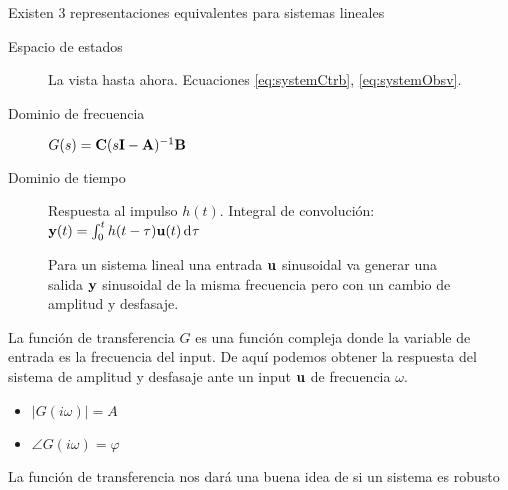 Existen 3 representaciones equivalentes para sistemas lineales
\begin{description}
	\item[Espacio de estados]  La vista hasta ahora. Ecuaciones \eqref{eq:systemCtrb}, \eqref{eq:systemObsv}.
	\item[Dominio de frecuencia] $G(s) = \mathbf{C} (s\mathbf{I} -\mathbf{A})^{-1}\mathbf{B}$
	\item[Dominio de tiempo	] Respuesta al impulso $h(t)$. Integral de convolución: $\Cy(t) = \int_0^t h(t-\tau)\Cu(t) \diff \tau$
\end{description}


\begin{figure}[htb!]
	\centering
{}
\caption{Para un sistema lineal una entrada $\mathbf{u}$ sinusoidal va generar una salida $\mathbf{y}$ sinusoidal de la misma frecuencia pero con un cambio de amplitud y desfasaje.}
\end{figure}

La función de transferencia $G$ es una función compleja donde la variable de entrada es la frecuencia del input. De aquí podemos obtener la respuesta del sistema de amplitud y desfasaje ante un input $\mathbf{u}$ de frecuencia $\omega$.
\begin{itemize}
\item $|G(i\omega)|=A$
\item $\angle G(i\omega) = \varphi$
\end{itemize} 

La función de transferencia nos dará una buena idea de si un sistema es robusto 

